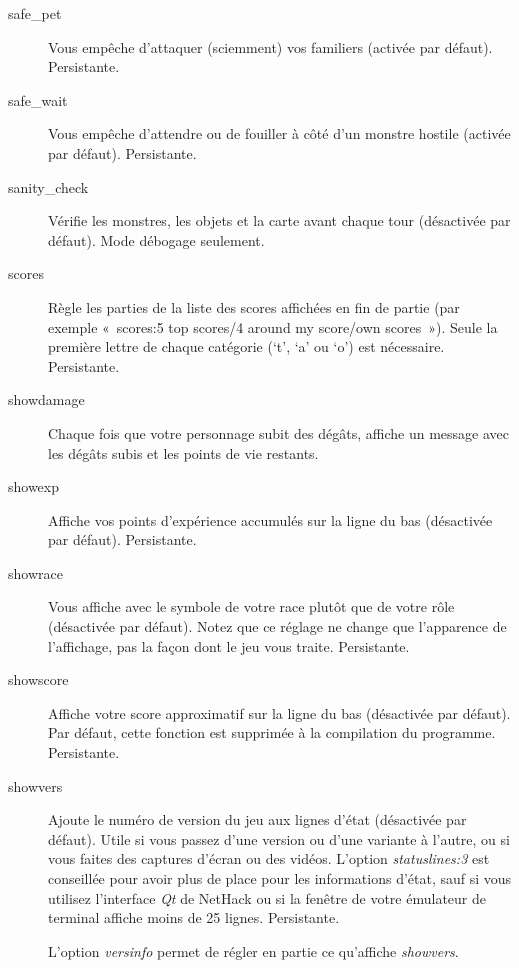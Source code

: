 \documentclass[titlepage]{article}
\begin{document}
\begin{description}
\item[{safe\_pet}]
Vous empêche d'attaquer (sciemment) vos familiers (activée par défaut).
Persistante.

\item[{safe\_wait}]
Vous empêche d'attendre ou de fouiller à côté d'un monstre hostile
(activée par défaut).
Persistante.

\item[{sanity\_check}]
Vérifie les monstres, les objets et la carte avant chaque tour (désactivée
par défaut).
Mode débogage seulement.

\item[{scores}]
Règle les parties de la liste des scores affichées en fin de partie (par
exemple «~scores:5 top scores/4 around my score/own scores~»).
Seule la première lettre de chaque catégorie (`t', `a' ou
`o') est nécessaire.
Persistante.

\item[{showdamage}]
Chaque fois que votre personnage subit des dégâts, affiche un message avec
les dégâts subis et les points de vie restants.

\item[{showexp}]
Affiche vos points d'expérience accumulés sur la ligne du bas (désactivée
par défaut).
Persistante.

\item[{showrace}]
Vous affiche avec le symbole de votre race plutôt que de votre rôle
(désactivée par défaut).
Notez que ce réglage ne change que l'apparence de l'affichage, pas la façon
dont le jeu vous traite.
Persistante.

\item[{showscore}]
Affiche votre score approximatif sur la ligne du bas (désactivée par
défaut).
Par défaut, cette fonction est supprimée à la compilation du programme.
Persistante.

\item[{showvers}]
Ajoute le numéro de version du jeu aux lignes d'état (désactivée par
défaut).
Utile si vous passez d'une version ou d'une variante à l'autre, ou si vous
faites des captures d'écran ou des vidéos.
L'option
\textit{statuslines:3}
est conseillée pour avoir plus de place pour les informations d'état,
sauf si vous utilisez l'interface \textit{Qt} de NetHack ou si la fenêtre de
votre émulateur de terminal affiche moins de 25 lignes.
Persistante.


L'option
\textit{versinfo}
permet de régler en partie ce qu'affiche
\textit{showvers}.


\end{description}
\end{document}
